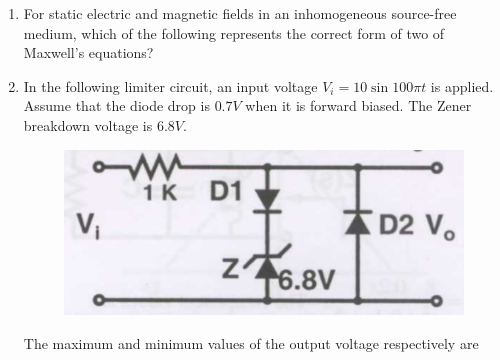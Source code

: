 \documentclass[a4paper, 11pt]{article}
\begin{document}
\begin{enumerate}
    \item For static electric and magnetic fields in an inhomogeneous source-free medium, which of the following represents the correct form of two of Maxwell's equations?
    
    \begin{enumerate}
    \end{enumerate}
    
    \hfill{}
    
    \item In the following limiter circuit, an input voltage $V_i = 10 \sin 100\pi t$ is applied. Assume that the diode drop is $0.7 V$ when it is forward biased. The Zener breakdown voltage is $6.8 V$.
    \begin{figure}[H]
        \centering
        \includegraphics[width=0.5\columnwidth]{q17}
        \caption*{}
        \label{fig:q17}
    \end{figure}
    The maximum and minimum values of the output voltage respectively are
    \begin{enumerate}
    \end{enumerate}
    

\end{enumerate}
\end{document}
